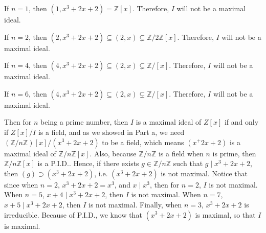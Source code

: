\begin{answer}

    If $n = 1$, then $(1,x^3+2x+2) = \mathbb{Z}[x]$. Therefore, $I$ will not be a maximal ideal.
    
    If $n = 2$, then $(2,x^3+2x+2) \subseteq (2,x) \subsetneq \mathbb{Z}/2\mathbb{Z}[x]$. Therefore, $I$ will not be a maximal ideal.
    
    If $n = 4$, then $(4,x^3+2x+2) \subseteq (2,x) \subsetneq \mathbb{Z}/[x]$. Therefore, $I$ will not be a maximal ideal.
    
    If $n = 6$, then $(4,x^3+2x+2) \subseteq (2,x) \subsetneq \mathbb{Z}/[x]$. Therefore, $I$ will not be a maximal ideal.
    
    Then for $n$ being a prime number, then $I$ is a maximal ideal of $Z[x]$ if and only if $Z[x]/I$ is a field, and as we showed in Part a, we need $(\mathbb{Z}/n\mathbb{Z})[x]/(x^3+2x+2)$ to be a field, which means $(x^+2x+2)$ is a maximal ideal of $\mathbb{Z}/n\mathbb{Z}[x]$. Also, because $\mathbb{Z}/n\mathbb{Z}$ is a field when $n$ is prime, then $\mathbb{Z}/n\mathbb{Z}[x]$ is a P.I.D.. Hence, if there exists $g \in \mathbb{Z}/n\mathbb{Z}$ such that $g \mid x^3+2x+2$, then $(g) \supset (x^3+2x+2)$, i.e. $(x^3+2x+2)$ is not maximal. Notice that since when $n = 2$, $x^3 + 2x + 2 = x^3$, and $x \mid x^3$, then for $n = 2$, $I$ is not maximal. When $n = 5$, $x+4 \mid x^3+2x+2$, then $I$ is not maximal. When $n = 7$, $x+5 \mid x^3+2x+2$, then $I$ is not maximal. Finally, when $n = 3$, $x^3+2x+2$ is irreducible. Because of P.I.D., we know that $(x^3+2x+2)$ is maximal, so that $I$ is maximal.
    
\end{answer}